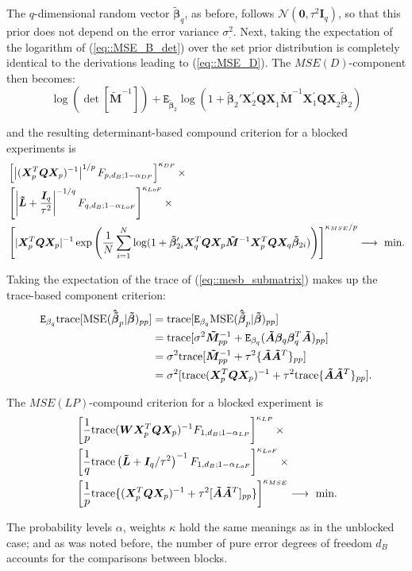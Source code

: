 The $q$-dimensional random vector $\bm{\tilde{\beta}}_q$, as before, follows $\mathcal{N}(\bm{0},\tau^{2}\bm{I}_{q})$, so that this prior does not depend on the error variance $\sigma_{.}^2$. Next, taking the expectation of the logarithm of (\ref{eq::MSE_B_det}) over the set prior distribution is completely identical to the derivations leading to (\ref{eq::MSE_D}). The $MSE(D)$-component then becomes:
\begin{equation}
\label{eq::mse_b_component}
\log(\det[\bm{\tilde{M}}^{-1}])+\mathtt{E}_{\bm{\tilde{\beta}}_2}\log(1+\bm{\tilde{\beta}}_2'\bm{X}_2^{'}\bm{QX}_1\bm{\tilde{M}}^{-1}\bm{X}_1^{'}\bm{QX}_2\bm{\tilde{\beta}}_2)
\end{equation}

and the resulting determinant-based compound criterion for a blocked experiments is
\begin{align}
\label{eq::MSE_D_B}
&\left[\left|(\bm{X}^T_{p}\bm{Q}\bm{X}_{p})^{-1}\right|^{1/p}F_{p,d_B;1-\alpha_{DP}}\right]^{\kappa_{DP}} \times \notag \\ &\left[\left|\bm{\tilde{L}}+\frac{\bm{I}_{q}}{\tau^{2}}\right|^{-1/q}F_{q,d_B;1-\alpha_{LoF}}\right]^{\kappa_{LoF}}\times \\ & \left[|\bm{X}^T_{p}\bm{QX}_{p}|^{-1}\exp\left(\frac{1}{N}\sum_{i=1}^{N}\log(1+\bm{\tilde{\beta}}_{2i}'\bm{X}_q^{T}\bm{QX}_p\bm{\tilde{M}}^{-1}\bm{X}_p^{T}\bm{QX}_q\bm{\tilde{\beta}}_{2i})\right)\right]^{\kappa_{MSE}/p} \longrightarrow \mbox{ min.}\notag
\end{align}

Taking the expectation of the trace of (\ref{eq::mesb_submatrix}) makes up the trace-based component criterion:
\begin{align}
\label{eq::MSE_B_tr}
\mathtt{E}_{\beta_q}\mbox{trace}[\mbox{MSE}(\bm{\hat{\tilde{\beta}}}_p|\bm{\tilde{\beta}})_{pp}]&= \mbox{trace}[\mathtt{E}_{\beta_q}\mbox{MSE}(\bm{\hat{\tilde{\beta}}}_p|\bm{\tilde{\beta}})_{pp}]\notag \\&=\mbox{trace}[\sigma^2\bm{\tilde{M}}^{-1}_{pp}+\mathtt{E}_{\beta_q}(\bm{\tilde{A}}\bm{\beta}_q\bm{\beta}_q^T\bm{\tilde{A}})_{pp}]\notag\\&=  \sigma^2\mbox{trace}[\bm{\tilde{M}}^{-1}_{pp}+\tau^2\{\bm{\tilde{A}}\bm{\tilde{A}}^T\}_{pp}]\notag \\&=\sigma^2[\mbox{trace}(\bm{X}^T_{p}\bm{QX}_{p})^{-1}+\tau^2\mbox{trace}\{\bm{\tilde{A}}\bm{\tilde{A}}^T\}_{pp}].
\end{align}

The $MSE(LP)$-compound criterion for a blocked experiment is
\begin{align}
\label{eq::MSE_L_B}
&\left[\frac{1}{p}\mbox{trace}(\bm{WX}^T_{p}\bm{Q}\bm{X}_{p})^{-1}F_{1,d_B;1-\alpha_{LP}}\right]^{\kappa_{LP}}\times \notag \\&\left[\frac{1}{q}\mbox{trace}\left(\bm{\tilde{L}}+\bm{I}_{q}/\tau^{2}\right)^{-1}F_{1,d_B;1-\alpha_{LoF}}\right]^{\kappa_{LoF}}\times \notag \\& \left[\frac{1}{p}\mbox{trace}\{(\bm{X}^T_{p}\bm{QX}_{p})^{-1}+\tau^2[\bm{\tilde{A}}\bm{\tilde{A}}^T]_{pp}\}\right]^{\kappa_{MSE}} \longrightarrow \mbox{ min.}
\end{align}

The probability levels $\alpha$, weights $\kappa$ hold the same meanings as in the unblocked case; and as was noted before, the number of pure error degrees of freedom $d_B$ accounts for the comparisons between blocks.